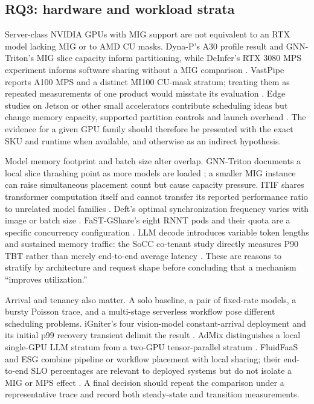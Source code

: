 \subsection{RQ3: hardware and workload strata}
Server-class NVIDIA GPUs with MIG support are not equivalent to an RTX model lacking MIG or to AMD CU masks. Dyna-P's A30 profile result and GNN-Triton's MIG slice capacity inform partitioning, while DeInfer's RTX 3080 MPS experiment informs software sharing without a MIG comparison \cite{dynap,gnntriton,deinfer}. VastPipe reports A100 MPS and a distinct MI100 CU-mask stratum; treating them as repeated measurements of one product would misstate its evaluation \cite{vastpipe}. Edge studies on Jetson or other small accelerators contribute scheduling ideas but change memory capacity, supported partition controls and launch overhead \cite{miriam,split,edge_sky}. The evidence for a given GPU family should therefore be presented with the exact SKU and runtime when available, and otherwise as an indirect hypothesis.

Model memory footprint and batch size alter overlap. GNN-Triton documents a local slice thrashing point as more models are loaded \cite{gnntriton}; a smaller MIG instance can raise simultaneous placement count but cause capacity pressure. ITIF shares transformer computation itself and cannot transfer its reported performance ratio to unrelated model families \cite{itif}. Deft's optimal synchronization frequency varies with image or batch size \cite{deft}. FaST-GShare's eight RNNT pods and their quota are a specific concurrency configuration \cite{fastgshare}. LLM decode introduces variable token lengths and sustained memory traffic: the SoCC co-tenant study directly measures P90 TBT rather than merely end-to-end average latency \cite{interference_deeper}. These are reasons to stratify by architecture and request shape before concluding that a mechanism ``improves utilization.''

Arrival and tenancy also matter. A solo baseline, a pair of fixed-rate models, a bursty Poisson trace, and a multi-stage serverless workflow pose different scheduling problems. iGniter's four vision-model constant-arrival deployment and its initial p99 recovery transient delimit the result \cite{igniter}. AdMix distinguishes a local single-GPU LLM stratum from a two-GPU tensor-parallel stratum \cite{admix}. FluidFaaS and ESG combine pipeline or workflow placement with local sharing; their end-to-end SLO percentages are relevant to deployed systems but do not isolate a MIG or MPS effect \cite{fluidfaas,esg}. A final decision should repeat the comparison under a representative trace and record both steady-state and transition measurements.
